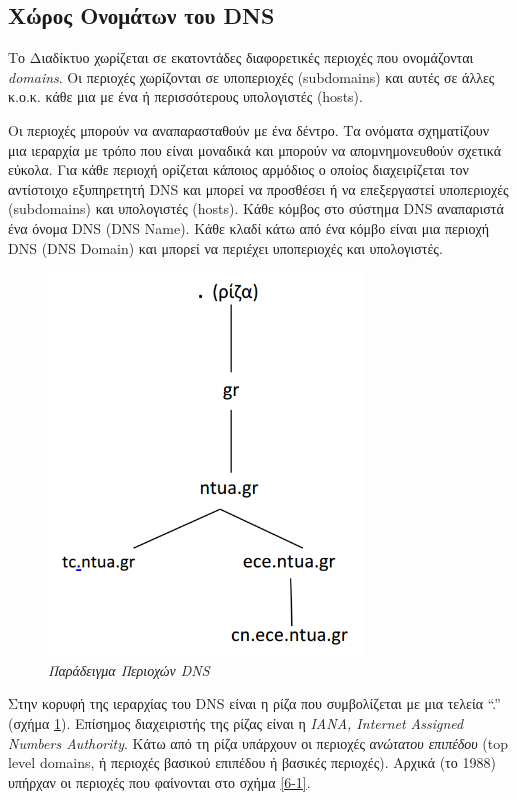 %
%
\subsection{Χώρος Ονομάτων του DNS}

Το Διαδίκτυο χωρίζεται σε εκατοντάδες διαφορετικές περιοχές που ονομάζονται \emph{domains}. Οι περιοχές χωρίζονται σε υποπεριοχές (subdomains) και αυτές σε άλλες κ.ο.κ. κάθε μια με ένα ή περισσότερους υπολογιστές (hosts).

Οι περιοχές μπορούν να αναπαρασταθούν με ένα δέντρο. Τα ονόματα σχηματίζουν μια ιεραρχία με τρόπο που είναι μοναδικά και μπορούν να απομνημονευθούν σχετικά εύκολα. Για κάθε περιοχή ορίζεται κάποιος αρμόδιος ο οποίος διαχειρίζεται τον αντίστοιχο εξυπηρετητή DNS και μπορεί να προσθέσει ή να επεξεργαστεί υποπεριοχές (subdomains) και υπολογιστές (hosts). Κάθε κόμβος στο σύστημα DNS αναπαριστά ένα όνομα DNS (DNS Name). Κάθε κλαδί κάτω από ένα κόμβο είναι μια περιοχή DNS (DNS Domain) και μπορεί να περιέχει υποπεριοχές και υπολογιστές.   

\begin{figure}[!ht]
  \centering
  \includegraphics[width=0.75\textwidth]{images/chapter6/6-0}
  \caption {\textsl{Παράδειγμα Περιοχών DNS}}
  \label{6-0}
\end{figure}

Στην κορυφή της ιεραρχίας του DNS είναι η ρίζα που συμβολίζεται με μια τελεία ``.'' (σχήμα \ref{6-0}). Επίσημος διαχειριστής της ρίζας είναι η \emph{IANA, Internet Assigned Numbers Authority}. Κάτω από τη ρίζα υπάρχουν οι περιοχές \emph{ανώτατου επιπέδου} (top level domains, ή περιοχές βασικού επιπέδου ή βασικές περιοχές). Αρχικά (το 1988) υπήρχαν οι περιοχές που φαίνονται στο σχήμα \ref{6-1}.

